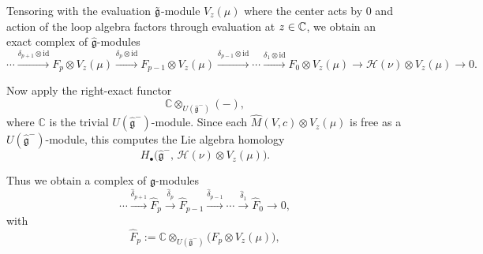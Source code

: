 \documentclass[12pt]{article}
\begin{document}
Tensoring with the evaluation $\tilde{\mathfrak{g}}$-module \(V_z(\mu)\) where the center acts by 0 and action of the loop algebra factors through evaluation at $z\in \mathbb{C}$, we obtain an exact complex of \(\hat{\mathfrak g}\)-modules
\[
\cdots \xrightarrow{\delta_{p+1}\otimes \mathrm{id}} F_p\otimes V_z(\mu)
\xrightarrow{\delta_p\otimes \mathrm{id}} F_{p-1}\otimes V_z(\mu)
\xrightarrow{\delta_{p-1}\otimes \mathrm{id}} \cdots
\xrightarrow{\delta_1\otimes \mathrm{id}} F_0\otimes V_z(\mu)
\to \mathcal H(\nu)\otimes V_z(\mu)\to 0.
\]

Now apply the right-exact functor
\[
\mathbb C\otimes_{U(\hat{\mathfrak g}^-)}(-),
\]
where \(\mathbb C\) is the trivial \(U(\hat{\mathfrak g}^-)\)-module. Since each
\(\widehat M(V,c)\otimes V_z(\mu)\) is free as a \(U(\hat{\mathfrak g}^-)\)-module, this computes the Lie algebra homology
\[
H_\bullet\bigl(\hat{\mathfrak g}^-,\,\mathcal H(\nu)\otimes V_z(\mu)\bigr).
\]

Thus we obtain a complex of \(\mathfrak g\)-modules
\[
\cdots \xrightarrow{\widehat\delta_{p+1}} \widehat F_p
\xrightarrow{\widehat\delta_p} \widehat F_{p-1}
\xrightarrow{\widehat\delta_{p-1}} \cdots
\xrightarrow{\widehat\delta_1} \widehat F_0 \to 0,
\]
with
\[
\widehat F_p
:=
\mathbb C\otimes_{U(\hat{\mathfrak g}^-)}\bigl(F_p\otimes V_z(\mu)\bigr),
\]
\end{document}
